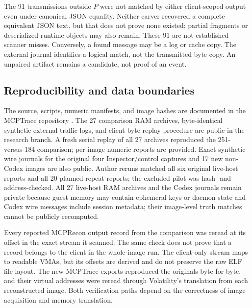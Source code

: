\documentclass[conference,10pt]{IEEEtran}
\begin{document}
The 91 transmissions outside $P$ were not matched by either client-scoped output even under canonical JSON equality. Neither carver recovered a complete equivalent JSON text, but that does not prove none existed; partial fragments or deserialized runtime objects may also remain. These 91 are not established scanner misses. Conversely, a found message may be a log or cache copy. The external journal identifies a logical match, not the transmitted byte copy. An unpaired artifact remains a candidate, not proof of an event.

\subsection{Reproducibility and data boundaries}
The source, scripts, numeric manifests, and image hashes are documented in the MCPTrace repository \cite{mcptrace}. The 27 comparison RAM archives, byte-identical synthetic external traffic logs, and client-byte replay procedure are public in the research branch. A fresh serial replay of all 27 archives reproduced the 251-versus-184 comparison; per-image numeric reports are provided. Exact synthetic wire journals for the original four Inspector/control captures and 17 new non-Codex images are also public. Author reruns matched all six original live-host reports and all 20 planned repeat reports; the excluded pilot was hash- and address-checked. All 27 live-host RAM archives and the Codex journals remain private because guest memory may contain ephemeral keys or daemon state and Codex wire messages include session metadata; their image-level truth matches cannot be publicly recomputed.

Every reported MCPRecon output record from the comparison was reread at its offset in the exact stream it scanned. The same check does not prove that a record belongs to the client in the whole-image run. The client-only stream maps to readable VMAs, but its offsets are derived and do not preserve the raw ELF file layout. The new MCPTrace exports reproduced the originals byte-for-byte, and their virtual addresses were reread through Volatility's translation from each reconstructed image. Both verification paths depend on the correctness of image acquisition and memory translation.
\end{document}
